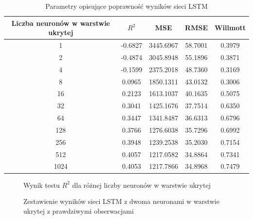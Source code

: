\documentclass[10pt,a4paper]{article}
\begin{document}
\begin{table}[h!]
	\centering
	\begin{tabular}{|c|c|c|c|c|}
		\hline
		Liczba neuronów w warstwie ukrytej & $R^2$ & MSE & RMSE & Willmott \\
		\hline
		1    & -0.6827 & 3445.6967 & 58.7001 & 0.3979 \\
		2    & -0.4874 & 3045.8948 & 55.1896 & 0.3871 \\
		4    & -0.1599 & 2375.2018 & 48.7360 & 0.3169 \\
		8    & 0.0965  & 1850.1311 & 43.0132 & 0.3006 \\
		16   & 0.2123  & 1613.1037 & 40.1635 & 0.5075 \\
		32   & 0.3041  & 1425.1676 & 37.7514 & 0.6350 \\
		64   & 0.3447  & 1341.8487 & 36.6313 & 0.6796 \\
		128  & 0.3766  & 1276.6038 & 35.7296 & 0.6992 \\
		256  & 0.3948  & 1239.2538 & 35.2030 & 0.7154 \\
		512  & 0.4057  & 1217.0582 & 34.8864 & 0.7341 \\
		1024 & 0.4053  & 1217.7866 & 34.8968 & 0.7479 \\
		\hline
	\end{tabular}
	\caption{Parametry opisujące poprawność wyników sieci LSTM}
	\label{table:lstm}
\end{table}
\begin{figure}[!ht]
	\centering
	\caption{Wynik testu $R^2$ dla różnej liczby neuronów w warstwie ukrytej}
	\label{figure:lstm_neurons}
\end{figure}
\FloatBarrier
\begin{figure}[!ht]
	\centering
	\caption{Zestawienie wyników sieci LSTM z dwoma neuronami w warstwie ukrytej z prawdziwymi obserwacjami}
	\label{figure:lstm_2}
\end{figure}
\end{document}

